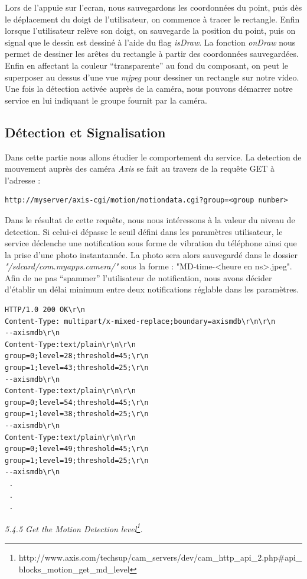 Lors de l'appuie sur l'ecran, nous sauvegardons les coordonnées du point, puis
dès le déplacement du doigt de l'utilisateur, on commence à tracer le rectangle.
Enfin lorsque l'utilisateur relève son doigt, on sauvegarde la position du
point, puis on signal que le dessin est dessiné à l'aide du flag
\textit{isDraw}. La fonction \textit{onDraw} nous permet de dessiner les arêtes
du rectangle à partir des coordonnées sauvegardées.\newline
\indent Enfin en affectant la couleur ``transparente'' au fond du composant, on
peut le superposer au dessus d'une vue \textit{mjpeg} pour dessiner un rectangle
sur notre video.\newline
\newline\indent Une fois la détection activée auprès de la caméra, nous pouvons
démarrer notre service en lui indiquant le groupe fournit par la caméra.

\subsection{Détection et Signalisation}
Dans cette partie nous allons étudier le comportement du service.
La detection de mouvement auprès des caméra \textit{Axis} se fait au travers de
la requête GET à l'adresse : 
\begin{lstlisting}
http://myserver/axis-cgi/motion/motiondata.cgi?group=<group number>
\end{lstlisting}
Dans le résultat de cette requête, nous nous intéressons à la valeur du niveau
de detection. Si celui-ci dépasse le seuil défini dans les paramètres
utilisateur, le service déclenche une notification sous forme de vibration du
téléphone ainsi que la prise d'une photo instantannée. La photo sera
alors sauvegardé dans le dossier \textit{"/sdcard/com.myapps.camera/"} sous la
forme : "MD-time-<heure en ns>.jpeg".
\newline Afin de ne pas ``spammer''
l'utilisateur de notification, nous avons décider d'établir un délai minimum entre deux notifications réglable dans les paramètres.
\begin{lstlisting}
HTTP/1.0 200 OK\r\n
Content-Type: multipart/x-mixed-replace;boundary=axismdb\r\n\r\n
--axismdb\r\n
Content-Type:text/plain\r\n\r\n
group=0;level=28;threshold=45;\r\n
group=1;level=43;threshold=25;\r\n
--axismdb\r\n
Content-Type:text/plain\r\n\r\n
group=0;level=54;threshold=45;\r\n
group=1;level=38;threshold=25;\r\n
--axismdb\r\n
Content-Type:text/plain\r\n\r\n
group=0;level=49;threshold=45;\r\n
group=1;level=19;threshold=25;\r\n
--axismdb\r\n
 .
 .
 . 
\end{lstlisting}
\textit{5.4.5 Get the Motion Detection
level\footnote{\label{MotionDetectionDoc}
http://www.axis.com/techsup/cam\_servers/dev/cam\_http\_api\_2.php\#api\_blocks\_motion\_get\_md\_level}.}


